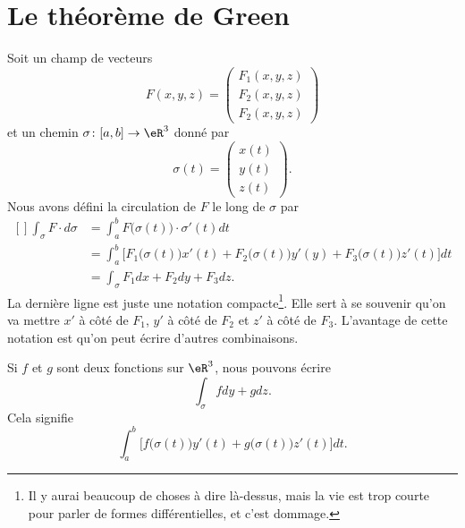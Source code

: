 
\section{Le théorème de Green}

Soit un champ de vecteurs
\begin{equation}
    F(x,y,z)=\begin{pmatrix}
        F_1(x,y,z)    \\
        F_2(x,y,z)    \\
        F_2(x,y,z)
    \end{pmatrix}
\end{equation}
et un chemin $\sigma\colon \mathopen[ a , b \mathclose]\to \eR^3$ donné par
\begin{equation}
    \sigma(t)=\begin{pmatrix}
        x(t)    \\
        y(t)    \\ 
        z(t)
    \end{pmatrix}.
\end{equation}
Nous avons défini la circulation de $F$ le long de $\sigma$ par
\begin{equation}
    \begin{aligned}[]
        \int_{\sigma}F\cdot d\sigma&=\int_a^bF\big( \sigma(t) \big)\cdot\sigma'(t)dt\\
        &=\int_a^b\Big[ F_1\big( \sigma(t) \big)x'(t)+F_2\big( \sigma(t) \big)y'(y)+F_3\big( \sigma(t) \big)z'(t)\Big]dt\\
        &=\int_{\sigma} F_1dx +F_2dy+F_3dz.
    \end{aligned}
\end{equation}
La dernière ligne est juste une notation compacte\footnote{Il y aurai beaucoup de choses à dire là-dessus, mais la vie est trop courte pour parler de formes différentielles, et c'est dommage.}. Elle sert à se souvenir qu'on va mettre $x'$ à côté de $F_1$, $y'$ à côté de $F_2$ et $z'$ à côté de $F_3$. L'avantage de cette notation est qu'on peut écrire d'autres combinaisons.

Si $f$ et $g$ sont deux fonctions sur $\eR^3$, nous pouvons écrire
\begin{equation}
    \int_{\sigma} fdy+gdz.
\end{equation}
Cela signifie
\begin{equation}
    \int_a^b \Big[ f\big( \sigma(t) \big)y'(t)+g\big( \sigma(t) \big)z'(t)\Big]dt.
\end{equation}

